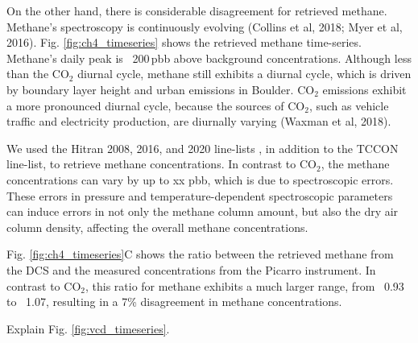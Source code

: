 \documentclass[amt, manuscript]{copernicus}
\begin{document}
On the other hand, there is considerable disagreement for retrieved methane. Methane’s spectroscopy is continuously evolving (Collins et al, 2018; Myer et al, 2016). Fig. \ref{fig:ch4_timeseries} shows the retrieved methane time-series. Methane’s daily peak is ~200\,pbb above background concentrations. Although less than the CO$_2$ diurnal cycle, methane still exhibits a diurnal cycle, which is driven by boundary layer height and urban emissions in Boulder. CO$_2$ emissions exhibit a more pronounced diurnal cycle, because the sources of CO$_2$, such as vehicle traffic and electricity production, are diurnally varying (Waxman et al, 2018).

We used the Hitran 2008, 2016, and 2020 line-lists , in addition to the TCCON line-list, to retrieve methane concentrations. In contrast to CO$_2$, the methane concentrations can vary by up to xx pbb, which is due to spectroscopic errors. These errors in pressure and temperature-dependent spectroscopic parameters can induce errors in not only the methane column amount, but also the dry air column density, affecting the overall methane concentrations.

Fig. \ref{fig:ch4_timeseries}C shows the ratio between the retrieved methane from the DCS and the measured concentrations from the Picarro instrument. In contrast to CO$_2$, this ratio for methane exhibits a much larger range, from ~0.93 to ~1.07, resulting in a 7\% disagreement in methane concentrations.

Explain Fig. \ref{fig:vcd_timeseries}.
\end{document}
